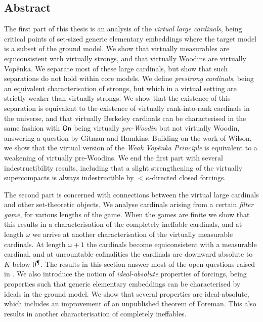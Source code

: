 \documentclass[../main]{subfiles}
\begin{document}
\thispagestyle{fancy}
\setlength{\parindent}{18pt}

\begin{onehalfspacing}

    \vspace*{75pt}

    \section*{\huge Abstract}

    The first part of this thesis is an analysis of the \textit{virtual large cardinals}, being critical points of set-sized generic elementary embeddings where the target model is a subset of the ground model. We show that virtually measurables are equiconsistent with virtually strongs, and that virtually Woodins are virtually Vop\v enka. We separate most of these large cardinals, but show that such separations do not hold within core models. We define \textit{prestrong cardinals}, being an equivalent characterisation of strongs, but which in a virtual setting are strictly weaker than virtually strongs. We show that the existence of this separation is equivalent to the existence of virtually rank-into-rank cardinals in the universe, and that virtually Berkeley cardinals can be characterised in the same fashion with $\textsf{On}$ being virtually \textit{pre-Woodin} but not virtually Woodin, answering a question by Gitman and Hamkins. Building on the work of Wilson, we show that the virtual version of the \textit{Weak Vop\v enka Principle} is equivalent to a weakening of virtually pre-Woodins. We end the first part with several indestructibility results, including that a slight strengthening of the virtually supercompacts is always indestructible by ${<}\kappa$-directed closed forcings.

    The second part is concerned with connections between the virtual large cardinals and other set-theoretic objects. We analyse cardinals arising from a certain \textit{filter game}, for various lengths of the game. When the games are finite we show that this results in a characterisation of the completely ineffable cardinals, and at length $\omega$ we arrive at another characterisation of the virtually measurable cardinals. At length $\omega+1$ the cardinals become equiconsistent with a measurable cardinal, and at uncountable cofinalities the cardinals are downward absolute to $K$ below $0^\mathparagraph$. The results in this section answer most of the open questions raised in \cite{HolySchlicht}. We also introduce the notion of \textit{ideal-absolute} properties of forcings, being properties such that generic elementary embeddings can be characterised by ideals in the ground model. We show that several properties are ideal-absolute, which includes an improvement of an unpublished theorem of Foreman. This also results in another characterisation of completely ineffables.

\end{onehalfspacing}
\end{document}

